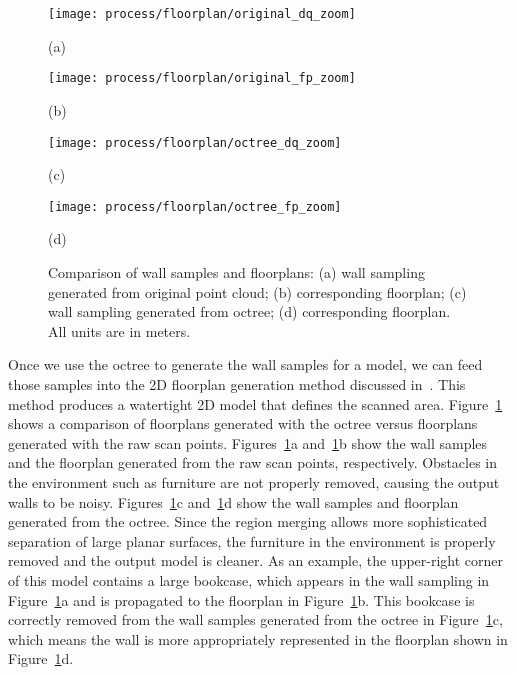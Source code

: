 \documentclass[review]{acmsiggraph}
\begin{document}
\begin{figure}[t]

	\begin{minipage}[t]{0.45\linewidth}
		\centerline{\texttt{[image: process/floorplan/original\_dq\_zoom]}}
		\centerline{(a)}
	\end{minipage}
	\hfill
	\begin{minipage}[t]{0.45\linewidth}
		\centerline{\texttt{[image: process/floorplan/original\_fp\_zoom]}}
		\centerline{(b)}
	\end{minipage}
	
	\begin{minipage}[t]{0.45\linewidth}
		\centerline{\texttt{[image: process/floorplan/octree\_dq\_zoom]}}
		\centerline{(c)}
	\end{minipage}
	\hfill
	\begin{minipage}[t]{0.45\linewidth}
		\centerline{\texttt{[image: process/floorplan/octree\_fp\_zoom]}}
		\centerline{(d)}
	\end{minipage}

	\caption{Comparison of wall samples and floorplans: (a) wall sampling generated from original point cloud; (b) corresponding floorplan; (c) wall sampling generated from octree; (d) corresponding floorplan.  All units are in meters.}
	\label{fig:fp_compare}
\end{figure}

Once we use the octree to generate the wall samples for a model, we can feed those samples into the 2D floorplan generation method discussed in~\cite{Turner14}.  This method produces a watertight 2D model that defines the scanned area.  Figure~\ref{fig:fp_compare} shows a comparison of floorplans generated with the octree versus floorplans generated with the raw scan points.  Figures~\ref{fig:fp_compare}a and~\ref{fig:fp_compare}b show the wall samples and the floorplan generated from the raw scan points, respectively.  Obstacles in the environment such as furniture are not properly removed, causing the output walls to be noisy.  Figures~\ref{fig:fp_compare}c and~\ref{fig:fp_compare}d show the wall samples and floorplan generated from the octree.  Since the region merging allows more sophisticated separation of large planar surfaces, the furniture in the environment is properly removed and the output model is cleaner.  As an example, the upper-right corner of this model contains a large bookcase, which appears in the wall sampling in Figure~\ref{fig:fp_compare}a and is propagated to the floorplan in Figure~\ref{fig:fp_compare}b.  This bookcase is correctly removed from the wall samples generated from the octree in Figure~\ref{fig:fp_compare}c, which means the wall is more appropriately represented in the floorplan shown in Figure~\ref{fig:fp_compare}d.
\end{document}
